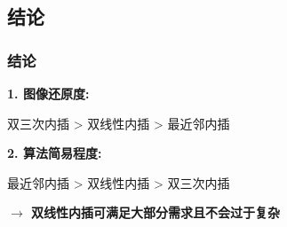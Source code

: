 \documentclass[notheorems,serif,table,compress]{beamer}  %
\begin{document}
\subsection{结论}
\begin{frame}
\frametitle{结论}
	\textbf{\color{blue}1. 图像还原度: }\\
	\mbox{}
	\begin{minipage}[t]{1\linewidth}
        \centering
        双三次内插 > 双线性内插 > 最近邻内插
        \end{minipage}
	\mbox{}
	\begin{minipage}[t]{1\linewidth}
	\textbf{\color{blue}2. 算法简易程度: }\\
	\end{minipage}
	\mbox{}
	\begin{minipage}[t]{1\linewidth}
        \centering
        最近邻内插 > 双线性内插 > 双三次内插
        \end{minipage}
	\mbox{}
	\begin{minipage}[t]{1\linewidth}
	\textbf{\color{red}$\rightarrow$ 双线性内插可满足大部分需求且不会过于复杂}
	\end{minipage}
\end{frame}
\end{document}

